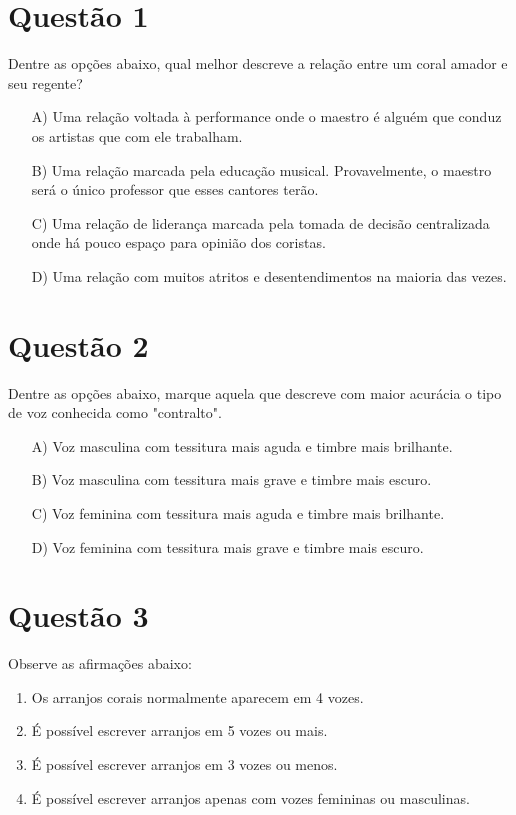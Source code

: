 \documentclass[a4paper, 12pt, openright, oneside, english, brazil, article]{abntex2}
\begin{document}
	
	\maketitle
	
	\section{Questão 1}
	Dentre as opções abaixo, qual melhor descreve a relação entre um coral amador e seu regente?
	
	\begin{enumerate}
		\item [A)] Uma relação voltada à performance onde o maestro é alguém que conduz os artistas que com ele trabalham.
		\item [B)] Uma relação marcada pela educação musical. Provavelmente, o maestro será o único professor que esses cantores terão.
		\item [C)] Uma relação de liderança marcada pela tomada de decisão centralizada onde há pouco espaço para opinião dos coristas.
		\item [D)] Uma relação com muitos atritos e desentendimentos na maioria das vezes.
	\end{enumerate}
	
	\section{Questão 2}
	Dentre as opções abaixo, marque aquela que descreve com maior acurácia o tipo de voz conhecida como "contralto".
	
	\begin{enumerate}
		\item [A)] Voz masculina com tessitura mais aguda e timbre mais brilhante.
		\item [B)] Voz masculina com tessitura mais grave e timbre mais escuro.
		\item [C)] Voz feminina com tessitura mais aguda e timbre mais brilhante.
		\item [D)] Voz feminina com tessitura mais grave e timbre mais escuro. 
	\end{enumerate}
	
	\section{Questão 3}
	Observe as afirmações abaixo:

	\begin{enumerate}
		\item Os arranjos corais normalmente aparecem em 4 vozes.
		\item É possível escrever arranjos em 5 vozes ou mais.
		\item É possível escrever arranjos em 3 vozes ou menos.
		\item É possível escrever arranjos apenas com vozes femininas ou masculinas.
	\end{enumerate}
	
\end{document}
